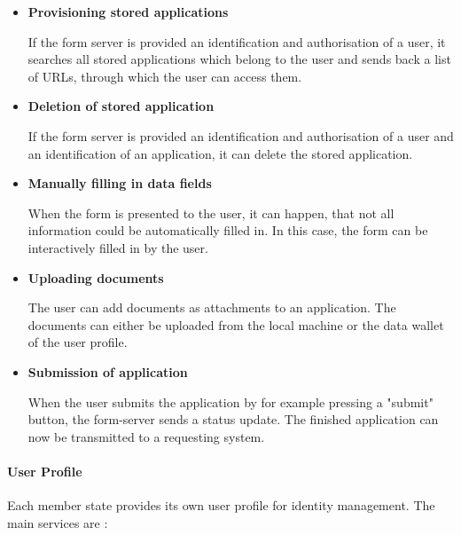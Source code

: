 \documentclass[
     12pt,         %
     a4paper,      %
     BCOR=10mm,version=first,     %
     DIV=14,version=first,        %
     ]{scrreprt}
\begin{document}
\begin{itemize}
    \item \textbf{Provisioning stored applications}
    
    If the form server is provided an identification and authorisation of a user, it searches all stored applications which belong to the user and sends back a list of URLs, through which the user can access them.
    
    \item \textbf{Deletion of stored application}

    If the form server is provided an identification and authorisation of a user and an identification of an application, it can delete the stored application.

    \item \textbf{Manually filling in data fields}
    
    When the form is presented to the user, it can happen, that not all information could be automatically filled in. In this case, the form can be interactively filled in by the user.
    
    \item \textbf{Uploading documents}
    
    The user can add documents as attachments to an application. The documents can either be uploaded from the local machine or the data wallet of the user profile.

    \item \textbf{Submission of application}
    
    When the user submits the application by for example pressing a "submit" button, the form-server sends a status update. The finished application can now be transmitted to a requesting system.

\end{itemize}

\paragraph{User Profile}
Each member state provides its own user profile for identity management. The main services are \cite{NRW:Umsetzung}:
\end{document}
